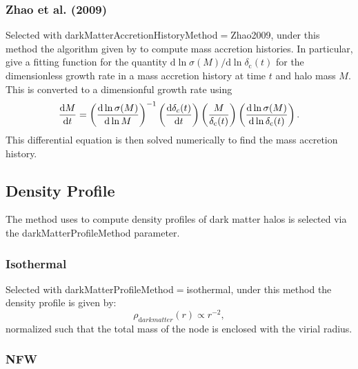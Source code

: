 \subsubsection{Zhao et al. (2009)}

Selected with {\normalfont \ttfamily darkMatterAccretionHistoryMethod}$=${\normalfont \ttfamily Zhao2009}, under this method the algorithm given by \cite{zhao_accurate_2009} to compute mass accretion histories. In particular, \cite{zhao_accurate_2009} give a fitting function for the quantity ${\mathrm d} \ln \sigma(M)/{\mathrm d} \ln  \delta_{\mathrm c}(t)$ for the dimensionless growth rate in a mass accretion history at time $t$ and halo mass $M$. This is converted to a dimensionful growth rate using
\begin{equation}
 {{\mathrm d} M \over {\mathrm d} t} = \left({{\mathrm d} \ln \sigma(M) \over {\mathrm d} \ln M}\right)^{-1} \left({{\mathrm d} \delta_c(t) \over {\mathrm d} t}\right) \left( {M \over \delta_{\mathrm c}(t)} \right) \left({{\mathrm d} \ln \sigma(M) \over {\mathrm d} \ln \delta_{\mathrm c}(t)}\right).
\end{equation}
This differential equation is then solved numerically to find the mass accretion history.

\subsection{Density Profile}

The method uses to compute density profiles of dark matter halos is selected via the {\normalfont \ttfamily darkMatterProfileMethod} parameter.

\subsubsection{Isothermal}

Selected with {\normalfont \ttfamily darkMatterProfileMethod}$=${\normalfont \ttfamily isothermal}, under this method the density profile is given by:
\begin{equation}
 \rho_{\mathrm dark matter}(r) \propto r^{-2},
\end{equation}
normalized such that the total mass of the \gls{node} is enclosed with the virial radius.

\subsubsection{NFW}

